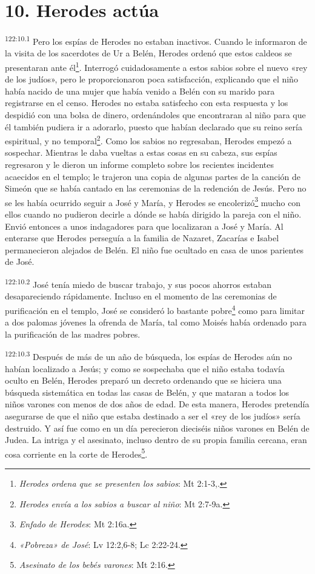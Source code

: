 \section*{10. Herodes actúa}
\par
\textsuperscript{122:10.1} Pero los espías de Herodes no estaban inactivos. Cuando le informaron de la visita de los sacerdotes de Ur a Belén, Herodes ordenó que estos caldeos se presentaran ante él\footnote{\textit{Herodes ordena que se presenten los sabios}: Mt 2:1-3,.}. Interrogó cuidadosamente a estos sabios sobre el nuevo «rey de los judíos», pero le proporcionaron poca satisfacción, explicando que el niño había nacido de una mujer que había venido a Belén con su marido para registrarse en el censo. Herodes no estaba satisfecho con esta respuesta y los despidió con una bolsa de dinero, ordenándoles que encontraran al niño para que él también pudiera ir a adorarlo, puesto que habían declarado que su reino sería espiritual, y no temporal\footnote{\textit{Herodes envía a los sabios a buscar al niño}: Mt 2:7-9a.}. Como los sabios no regresaban, Herodes empezó a sospechar. Mientras le daba vueltas a estas cosas en su cabeza, sus espías regresaron y le dieron un informe completo sobre los recientes incidentes acaecidos en el templo; le trajeron una copia de algunas partes de la canción de Simeón que se había cantado en las ceremonias de la redención de Jesús. Pero no se les había ocurrido seguir a José y María, y Herodes se encolerizó\footnote{\textit{Enfado de Herodes}: Mt 2:16a.} mucho con ellos cuando no pudieron decirle a dónde se había dirigido la pareja con el niño. Envió entonces a unos indagadores para que localizaran a José y María. Al enterarse que Herodes perseguía a la familia de Nazaret, Zacarías e Isabel permanecieron alejados de Belén. El niño fue ocultado en casa de unos parientes de José.

\par
\textsuperscript{122:10.2} José tenía miedo de buscar trabajo, y sus pocos ahorros estaban desapareciendo rápidamente. Incluso en el momento de las ceremonias de purificación en el templo, José se consideró lo bastante pobre\footnote{\textit{«Pobreza» de José}: Lv 12:2,6-8; Lc 2:22-24.} como para limitar a dos palomas jóvenes la ofrenda de María, tal como Moisés había ordenado para la purificación de las madres pobres.

\par
\textsuperscript{122:10.3} Después de más de un año de búsqueda, los espías de Herodes aún no habían localizado a Jesús; y como se sospechaba que el niño estaba todavía oculto en Belén, Herodes preparó un decreto ordenando que se hiciera una búsqueda sistemática en todas las casas de Belén, y que mataran a todos los niños varones con menos de dos años de edad. De esta manera, Herodes pretendía asegurarse de que el niño que estaba destinado a ser el «rey de los judíos» sería destruido. Y así fue como en un día perecieron dieciséis niños varones en Belén de Judea. La intriga y el asesinato, incluso dentro de su propia familia cercana, eran cosa corriente en la corte de Herodes\footnote{\textit{Asesinato de los bebés varones}: Mt 2:16.}.

